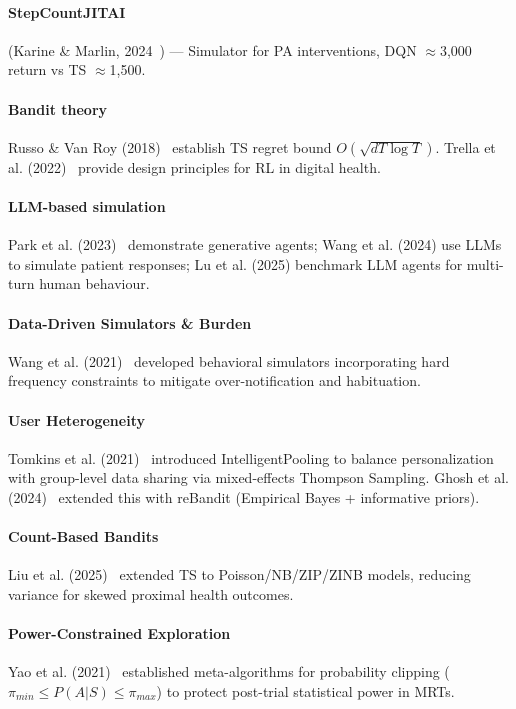 \documentclass[10pt,a4paper]{article}
\begin{document}
\paragraph{StepCountJITAI} (Karine \& Marlin, 2024~\cite{karine2024stepcountjitai}) --- Simulator for PA interventions, DQN $\approx$3,000 return vs TS $\approx$1,500.

\paragraph{Bandit theory} Russo \& Van Roy (2018)~\cite{russo2018learning} establish TS regret bound \(O(\sqrt{dT\log T})\). Trella et al. (2022)~\cite{trella2022designing} provide design principles for RL in digital health.

\paragraph{LLM-based simulation} Park et al. (2023)~\cite{park2023generative} demonstrate generative agents; Wang et al. (2024) use LLMs to simulate patient responses; Lu et al. (2025) benchmark LLM agents for multi-turn human behaviour.

\paragraph{Data-Driven Simulators \& Burden} Wang et al. (2021)~\cite{wang2021optimizing} developed behavioral simulators incorporating hard frequency constraints to mitigate over-notification and habituation.

\paragraph{User Heterogeneity} Tomkins et al. (2021)~\cite{tomkins2021intelligentpooling} introduced IntelligentPooling to balance personalization with group-level data sharing via mixed-effects Thompson Sampling. Ghosh et al. (2024)~\cite{ghosh2024rebandit} extended this with reBandit (Empirical Bayes + informative priors).

\paragraph{Count-Based Bandits} Liu et al. (2025)~\cite{liu2025thompson} extended TS to Poisson/NB/ZIP/ZINB models, reducing variance for skewed proximal health outcomes.

\paragraph{Power-Constrained Exploration} Yao et al. (2021)~\cite{yao2021power} established meta-algorithms for probability clipping (\(\pi_{min} \le P(A|S) \le \pi_{max}\)) to protect post-trial statistical power in MRTs.
\end{document}
